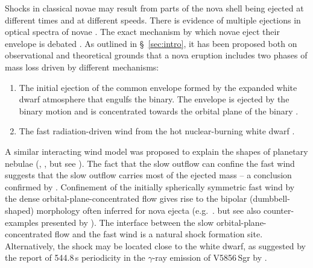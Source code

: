 \documentclass[a4paper,fleqn,usenatbib]{mnras}
\begin{document}
Shocks in classical novae may result from 
parts of the nova shell being ejected at different times and 
at different speeds. 
There is evidence of multiple ejections 
in optical spectra of novae \citep{1987Msngr..50....8D,2020ApJ...905...62A}. 
The exact mechanism by which novae eject their envelope is debated
\citep[sec.~2.2 of][]{2021ARA&A..59..391C}. 
As outlined in 
\S~\ref{sec:intro},
it has been 
proposed both on observational \citep{2014Natur.514..339C} and theoretical
\citep{1990LNP...369..342L,2022ApJ...938...31S} grounds that a nova
eruption includes two phases of mass loss driven by different mechanisms: 
\begin{enumerate}
\item The initial ejection of the common envelope formed by the expanded white
dwarf atmosphere that engulfs the binary. The envelope is ejected by the
binary motion and is concentrated towards the orbital plane of the binary
\citep{1980MNRAS.191..933M,1990ApJ...356..250L,1997MNRAS.284..137L}.
\item The fast radiation-driven wind from the hot nuclear-burning white dwarf
\citep{1994ApJ...437..802K,2011A&A...536A..97F}.
\end{enumerate}
A similar interacting wind model was proposed to explain the shapes of planetary nebulae
(\citealt{1982ApJ...258..280K}, \citealt{1989ApJ...339..268S}, but see \citealt{2002ARA&A..40..439B}). 
The fact that the slow outflow can confine the fast wind suggests that 
the slow outflow carries most of the ejected mass -- a conclusion confirmed by \cite{2022ApJ...938...31S}.
Confinement of the initially spherically symmetric fast wind by the dense 
orbital-plane-concentrated flow gives rise to the bipolar (dumbbell-shaped) morphology
often inferred for nova ejecta
(e.g.~\citealt{2013MNRAS.433.1991R,2014ApJ...792...57R,2016AstL...42...10T,2022MNRAS.511.1591T,2022ApJ...932...39N}. 
but see also counter-examples presented by \citealt{2022MNRAS.512.2003S}).
The interface between the slow orbital-plane-concentrated flow and the fast wind is a natural shock formation site.
%
Alternatively, the shock may be located close to
the white dwarf, as suggested by the report of 544.8\,s periodicity in the $\gamma$-ray
emission of V5856\,Sgr by \cite{2022ApJ...924L..17L}.
\end{document}
